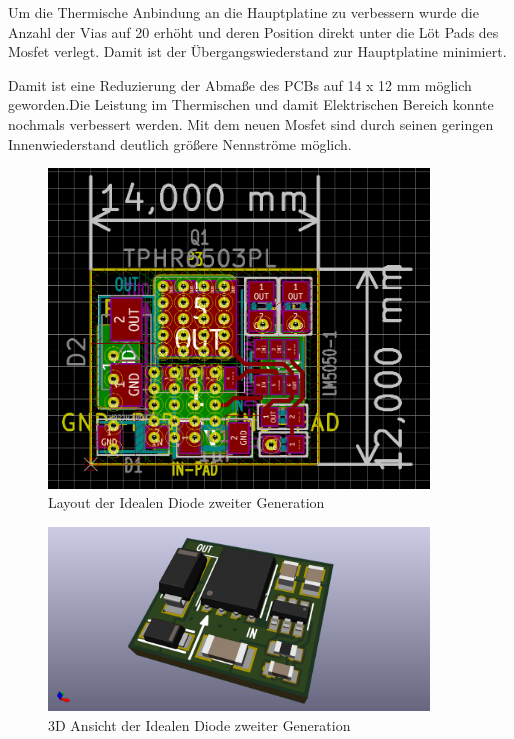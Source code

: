 Um die Thermische Anbindung an die Hauptplatine zu verbessern wurde die Anzahl der Vias auf 20 erhöht und deren Position direkt unter die Löt Pads des Mosfet verlegt. Damit ist der Übergangswiederstand \cite{Heat_Transfer}zur Hauptplatine minimiert.

Damit ist eine Reduzierung der Abmaße des PCBs auf 14 x 12 mm möglich geworden.Die Leistung im Thermischen und damit Elektrischen Bereich konnte nochmals verbessert werden. Mit dem neuen Mosfet sind durch seinen geringen Innenwiederstand deutlich größere Nennströme möglich.


\begin{figure}[H]
\centering
\includegraphics[width=0.9\textwidth]{bilder/Ideale_Diode/Ideale_Diode_25V_rev00_ver00.png} 
\caption{Layout der Idealen Diode zweiter Generation} 
\label{fig:Layout der Idealen Diode zweiter Generation}
\end{figure}



\begin{figure}[H]
\centering
\includegraphics[width=0.9\textwidth]{bilder/Ideale_Diode/Ideale_Diode_25V_rev00_ver00-3D.png} 
\caption{3D Ansicht der Idealen Diode zweiter Generation} 
\label{fig:3D Ansicht der Idealen Diode zweiter Generation}
\end{figure}


